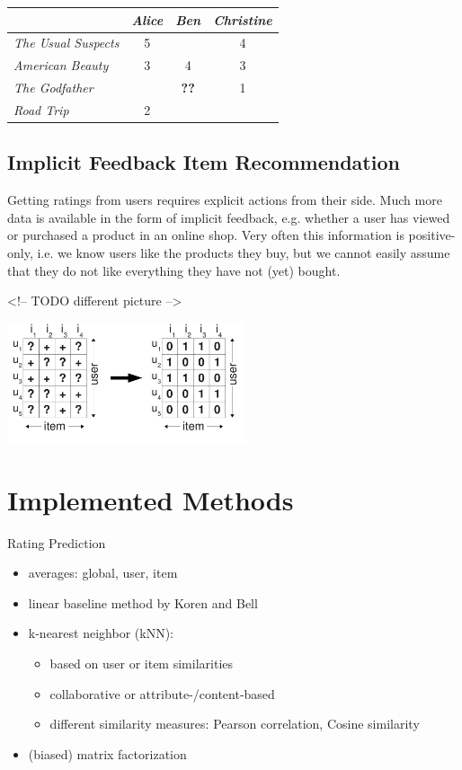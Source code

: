 \documentclass[a4paper, foldmark, 12pt]{leaflet}
\newcommand{\UserI}{\textit{Alice}}
\newcommand{\UserII}{\textit{Ben}}
\newcommand{\UserIII}{\textit{Christine}}
\newcommand{\MovieI}{\textit{The Usual Suspects}}
\newcommand{\MovieII}{\textit{American Beauty}}
\newcommand{\MovieIII}{\textit{The Godfather}}
\newcommand{\MovieIV}{\textit{Road Trip}}
\begin{document}
\begin{center}
      \begin{tabular}{|l||c|c|c|}
        \hline
	           & \UserI & \UserII & \UserIII \\ \hline
	\hline
	\MovieI    &  5   &     & 4     \\ \hline
	\MovieII   &  3   & 4   & 3    \\ \hline
	\MovieIII  &      & \textbf{??}    & 1    \\ \hline
	\MovieIV   &  2   &     &        \\ \hline
      \end{tabular}
\end{center}


\subsection{Implicit Feedback Item Recommendation}

Getting ratings from users requires explicit actions from their side.
Much more data is available in the form of implicit feedback,
e.g. whether a user has viewed or purchased a product in an online shop.
Very often this information is positive-only,
i.e. we know users like the products they buy, but we cannot easily assume
that they do not like everything they have not (yet) bought.

<!-- TODO different picture -->
\begin{center}
	\includegraphics[width=7.0cm]{fig/interpretation_single.pdf}
\end{center}

\newpage 

\section{Implemented Methods}
Rating Prediction
\begin{itemize}
	\item averages: global, user, item
	\item linear baseline method by Koren and Bell
	\item k-nearest neighbor (kNN):
		\begin{itemize}
			\item based on user or item similarities
			\item collaborative or attribute-/content-based
			\item different similarity measures: Pearson correlation, Cosine similarity
		\end{itemize}
	\item (biased) matrix factorization
\end{itemize}
\end{document}
